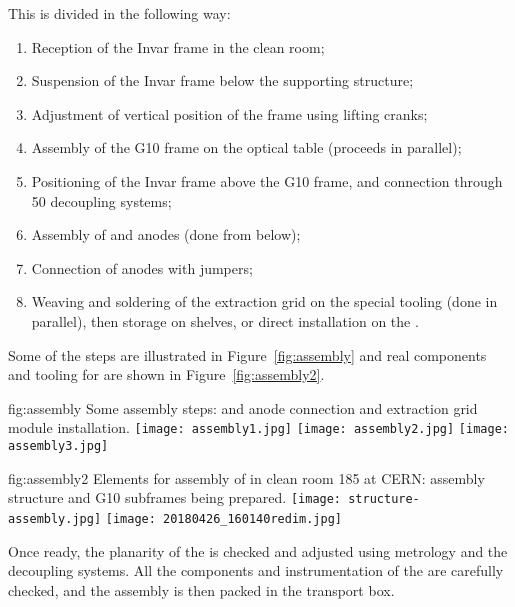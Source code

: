 This is divided in the following way:
\begin{enumerate}
\item Reception of the Invar frame in the clean room;
\item  Suspension of the Invar frame below the supporting structure;
\item  Adjustment of vertical position of the frame using lifting cranks;
\item  Assembly of the G10 frame on the optical table (proceeds in parallel);
\item  Positioning of the Invar frame %
above the G10 frame, and connection through \num{50} decoupling systems;
\item  Assembly of  and anodes (done from below);
\item  Connection of anodes  with jumpers;
\item  Weaving and soldering of the extraction grid on the special tooling (done in parallel), then storage on shelves, or direct installation on the .
\end{enumerate}
Some of the steps are illustrated in Figure~\ref{fig:assembly} and real components and tooling for  are shown in Figure~\ref{fig:assembly2}.

\begin{dunefigure}{fig:assembly}
{Some assembly steps:  and anode connection and extraction grid module installation.}
\texttt{[image: assembly1.jpg]}
\texttt{[image: assembly2.jpg]}
\texttt{[image: assembly3.jpg]}
\end{dunefigure}

\begin{dunefigure}{fig:assembly2}
{Elements for assembly of   in clean room 185 at CERN: assembly structure and G10 subframes being prepared.}
\texttt{[image: structure-assembly.jpg]}
\texttt{[image: 20180426\_160140redim.jpg]}
\end{dunefigure}
Once ready, the planarity of the  is checked and adjusted using metrology and the decoupling systems.
All the components and instrumentation of the  are carefully checked, and the assembly is then packed in the transport box.

